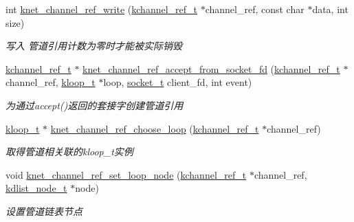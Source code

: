 \begin{DoxyCompactItemize}
int \hyperlink{a00049_a1536dcaeffcf43addfb34b406dbafd4f_a1536dcaeffcf43addfb34b406dbafd4f}{knet\+\_\+channel\+\_\+ref\+\_\+write} (\hyperlink{a00051_a3b7e82599367eade261456f60ebe2cd9_a3b7e82599367eade261456f60ebe2cd9}{kchannel\+\_\+ref\+\_\+t} $\ast$channel\+\_\+ref, const char $\ast$data, int size)
\begin{DoxyCompactList}\small\item\em 写入 管道引用计数为零时才能被实际销毁 \end{DoxyCompactList}\item 
\hyperlink{a00051_a3b7e82599367eade261456f60ebe2cd9_a3b7e82599367eade261456f60ebe2cd9}{kchannel\+\_\+ref\+\_\+t} $\ast$ \hyperlink{a00049_a97f52cae86124080471b331333852734_a97f52cae86124080471b331333852734}{knet\+\_\+channel\+\_\+ref\+\_\+accept\+\_\+from\+\_\+socket\+\_\+fd} (\hyperlink{a00051_a3b7e82599367eade261456f60ebe2cd9_a3b7e82599367eade261456f60ebe2cd9}{kchannel\+\_\+ref\+\_\+t} $\ast$channel\+\_\+ref, \hyperlink{a00051_a97fc76209a58362019f1ded9169e397f_a97fc76209a58362019f1ded9169e397f}{kloop\+\_\+t} $\ast$loop, \hyperlink{a00051_a0d9e0afbf02fb6ed6c5b1415dce51b05_a0d9e0afbf02fb6ed6c5b1415dce51b05}{socket\+\_\+t} client\+\_\+fd, int event)
\begin{DoxyCompactList}\small\item\em 为通过accept()返回的套接字创建管道引用 \end{DoxyCompactList}\item 
\hyperlink{a00051_a97fc76209a58362019f1ded9169e397f_a97fc76209a58362019f1ded9169e397f}{kloop\+\_\+t} $\ast$ \hyperlink{a00049_a6388ed40ffcaef7e775cae207486d308_a6388ed40ffcaef7e775cae207486d308}{knet\+\_\+channel\+\_\+ref\+\_\+choose\+\_\+loop} (\hyperlink{a00051_a3b7e82599367eade261456f60ebe2cd9_a3b7e82599367eade261456f60ebe2cd9}{kchannel\+\_\+ref\+\_\+t} $\ast$channel\+\_\+ref)
\begin{DoxyCompactList}\small\item\em 取得管道相关联的kloop\+\_\+t实例 \end{DoxyCompactList}\item 
void \hyperlink{a00049_a61952ee84bc8d572ab77163e919a54d8_a61952ee84bc8d572ab77163e919a54d8}{knet\+\_\+channel\+\_\+ref\+\_\+set\+\_\+loop\+\_\+node} (\hyperlink{a00051_a3b7e82599367eade261456f60ebe2cd9_a3b7e82599367eade261456f60ebe2cd9}{kchannel\+\_\+ref\+\_\+t} $\ast$channel\+\_\+ref, \hyperlink{a00051_ac701f00a0851c97467ae35c382b316b7_ac701f00a0851c97467ae35c382b316b7}{kdlist\+\_\+node\+\_\+t} $\ast$node)
\begin{DoxyCompactList}\small\item\em 设置管道链表节点 \end{DoxyCompactList}\item 

\end{DoxyCompactItemize}
